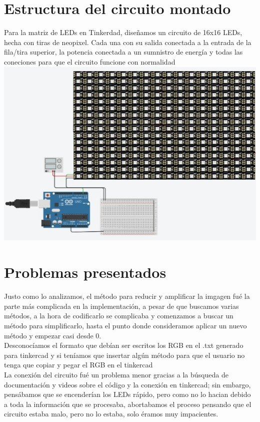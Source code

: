 \documentclass{article}
\begin{document}
\section{Estructura del circuito montado}
Para la matriz de LEDs en Tinkerdad, diseñamos un circuito de 16x16 LEDs, hecha con tiras de neopixel. Cada una con su salida conectada a la entrada de la fila/tira superior, la potencia conectada a un sumnistro de energía y todas las coneciones para que el circuito funcione con normalidad\\

\includegraphics[width=14cm]{Imagenes/circuito.jpeg}

\section{Problemas presentados}
Justo como lo analizamos, el método para reducir y amplificar la imgagen fué la parte más complicada en la implementación, a pesar de que buscamos varias métodos, a la hora de codificarlo se complicaba y comenzamos a buscar un método para simplificarlo, hasta el punto donde consideramos aplicar un nuevo método y empezar casi desde 0.\\

Desconocíamos el formato que debían ser escritos los RGB en el .txt generado para tinkercad y si teníamos que insertar algún método para que el usuario no tenga que copiar y pegar el RGB en el tinkercad\\

La conexión del circuito fué un problema menor gracias a la búsqueda de documentación y videos sobre el código y la conexión en tinkercad; sin embargo, pensábamos que se encenderían los LEDs rápido, pero como no lo hacian debido a toda la información que se procesaba, abortabamos el proceso pensando que el circuito estaba malo, pero no lo estaba, solo éramos muy impacientes. 
\end{document}
